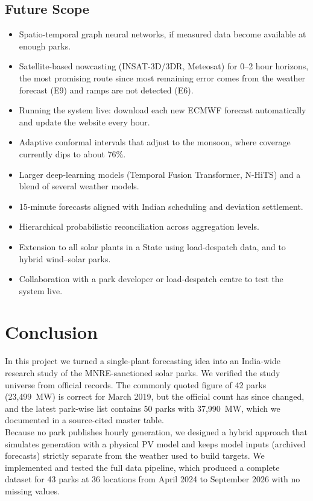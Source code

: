 \documentclass[12pt]{report}
\begin{document}
\section{Future Scope}
\vspace{1mm}
\begin{itemize}[noitemsep]
    \item Spatio-temporal graph neural networks, if measured data become available at enough parks.
    \item Satellite-based nowcasting (INSAT-3D/3DR, Meteosat) for 0--2 hour horizons, the most promising route since most remaining error comes from the weather forecast (E9) and ramps are not detected (E6).
    \item Running the system live: download each new ECMWF forecast automatically and update the website every hour.
    \item Adaptive conformal intervals that adjust to the monsoon, where coverage currently dips to about 76\%.
    \item Larger deep-learning models (Temporal Fusion Transformer, N-HiTS) and a blend of several weather models.
    \item 15-minute forecasts aligned with Indian scheduling and deviation settlement.
    \item Hierarchical probabilistic reconciliation across aggregation levels.
    \item Extension to all solar plants in a State using load-despatch data, and to hybrid wind--solar parks.
    \item Collaboration with a park developer or load-despatch centre to test the system live.
\end{itemize}

\clearpage
\chapter{Conclusion}
In this project we turned a single-plant forecasting idea into an India-wide research study of the MNRE-sanctioned solar parks. We verified the study universe from official records. The commonly quoted figure of 42 parks (23,499~MW) is correct for March 2019, but the official count has since changed, and the latest park-wise list contains 50 parks with 37,990~MW, which we documented in a source-cited master table.\\

Because no park publishes hourly generation, we designed a hybrid approach that simulates generation with a physical PV model and keeps model inputs (archived forecasts) strictly separate from the weather used to build targets. We implemented and tested the full data pipeline, which produced a complete dataset for 43 parks at 36 locations from April 2024 to September 2026 with no missing values.\\
\end{document}
